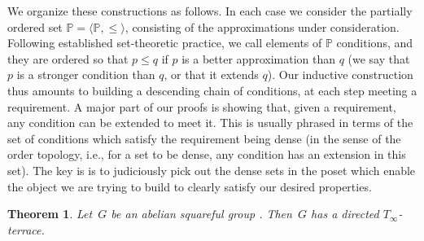 \documentclass[12pt,a4paper]{article}
\newtheorem{thm}{Theorem}[section]
\renewcommand{\P}{\mathbb{P}}
\begin{document}
We organize these constructions as follows. In each case we consider the partially ordered set $\P=\langle \P, \leq\rangle$, consisting of the approximations under consideration. Following established set-theoretic practice, we call elements of $\P$ conditions, and they are ordered so that $p\leq q$ if $p$ is a better approximation than $q$ (we say that $p$ is a stronger condition than $q$, or that it extends $q$).  Our inductive construction thus amounts to building a descending chain of conditions, at each step meeting a requirement. A major part of our proofs is showing that, given a requirement, any condition can be extended to meet it. This is usually phrased in terms of the set of conditions which satisfy the requirement being dense (in the sense of the order topology, i.e., for a set to be dense, any condition has an extension in this set). The key is is to judiciously pick out the dense sets in the poset which enable the object we are trying to build to clearly satisfy our desired properties.

\begin{thm}\label{th:T_infty}
Let~$G$ be an abelian squareful group%
. Then~$G$ has a directed $T_{\infty}$-terrace.
\end{thm}
\end{document}
